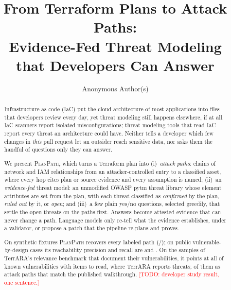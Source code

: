 \documentclass[sigconf,review,anonymous]{acmart}
\newcommand{\sys}{\textsc{PlanPath}\xspace}   %
\newcommand{\todo}[1]{\textcolor{red}{[TODO: #1]}}
\begin{document}
\title{From Terraform Plans to Attack Paths:\\Evidence-Fed Threat Modeling that Developers Can Answer}

\author{Anonymous Author(s)}

\begin{abstract}
Infrastructure as code (IaC) put the cloud architecture of most applications into files that developers review every day,
yet threat modeling still happens elsewhere, if at all. IaC scanners report isolated misconfigurations; threat modeling
tools that read IaC report every threat an architecture could have. Neither tells a developer which few changes in
\emph{this} pull request let an outsider reach sensitive data, nor asks them the handful of questions only they can answer.

We present \sys, which turns a Terraform plan into (i)~\emph{attack paths}: chains of network and IAM relationships from an
attacker-controlled entry to a classified asset, where every hop cites plan or source evidence and every assumption is named;
(ii)~an \emph{evidence-fed} threat model: an unmodified OWASP pytm threat library whose element attributes are set from the
plan, with each threat classified as \emph{confirmed} by the plan, \emph{ruled out} by it, or \emph{open}; and (iii)~a few
plain yes/no questions, selected greedily, that settle the open threats on the paths first. Answers become attested evidence
that can never change a path. Language models only re-tell what the evidence establishes, under a validator, or propose a patch
that the pipeline re-plans and proves.

On \NumTOneFixtures synthetic fixtures \sys recovers every labeled path (\NumTOnePathTP/\NumTOnePathTP); on \NumTTwoCases
public vulnerable-by-design cases its reachability precision and recall are \NumTTwoPrecision and \NumTTwoRecall. On the
samples of TerrARA's relevance benchmark that document their vulnerabilities, it points at all \NumTBDeveloper of
\NumTBVulns known vulnerabilities with \NumTBItems items to read, where TerrARA reports \NumTBTerraraThreats threats;
\NumTBPath of them as attack paths that match the published walkthrough. \todo{developer study result, one sentence.}
\end{abstract}

\maketitle
\end{document}
